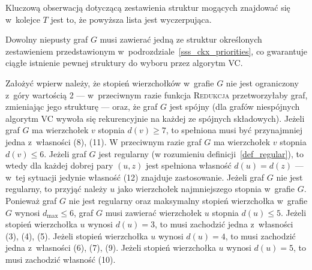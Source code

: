 {  Kluczową obserwacją dotyczącą zestawienia struktur mogących znajdować się w~kolejce $T$ jest to, że powyższa lista jest wyczerpująca.
  \begin{theorem}
    Dowolny niepusty graf $G$ musi zawierać jedną ze struktur określonych zestawieniem przedstawionym w~podrozdziale~\ref{sss_ckx_priorities}, co gwarantuje ciągłe istnienie pewnej struktury do wyboru przez algorytm \textsc{VC}.
  \end{theorem}
  \begin{bproof}
    Założyć wpierw należy, że stopień wierzchołków w~grafie $G$ nie jest ograniczony z~góry wartością 2 --- w~przeciwnym razie funkcja \textsc{Redukcja} przetworzyłaby graf, zmieniając jego strukturę --- oraz, że graf $G$ jest spójny (dla grafów niespójnych algorytm \textsc{VC} wywoła się rekurencyjnie na każdej ze spójnych składowych).
    Jeżeli graf $G$ ma wierzchołek $v$ stopnia $d(v) \geq 7$, to spełniona musi być przynajmniej jedna z~własności (8), (11).
    W przeciwnym razie graf $G$ ma wierzchołek $v$ stopnia $d(v) \leq 6$.
    Jeżeli graf $G$ jest regularny (w rozumieniu definicji~\ref{def_regular}), to wtedy dla każdej dobrej pary $(u, z)$ jest spełniona własność $d(u)=d(z)$ --- w~tej sytuacji jedynie własność (12) znajduje zastosowanie.
    Jeżeli graf $G$ nie jest regularny, to przyjąć należy $u$ jako wierzchołek najmniejszego stopnia w~grafie $G$.
    Ponieważ graf $G$ nie jest regularny oraz maksymalny stopień wierzchołka w~grafie $G$ wynosi $d_{\max} \leq 6$, graf $G$ musi zawierać wierzchołek $u$ stopnia $d(u) \leq 5$.
    Jeżeli stopień wierzchołka $u$ wynosi $d(u)=3$, to musi zachodzić jedna z~własności (3), (4), (5).
    Jeżeli stopień wierzchołka $u$ wynosi $d(u)=4$, to musi zachodzić jedna z~własności (6), (7), (9).
    Jeżeli stopień wierzchołka $u$ wynosi $d(u)=5$, to musi zachodzić własność (10).
  \end{bproof}
}
